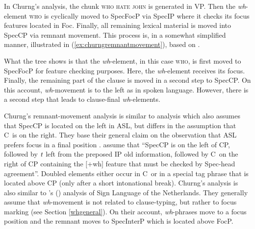 \noindent In Churng's analysis, the chunk \textsc{who hate john} is generated in VP. Then the \textit{wh}-element \textsc{who} is cyclically moved to SpecFocP via SpecIP where it checks its focus features located in Foc\textdegree . Finally, all remaining lexical material is moved into SpecCP via remnant movement. This process is, in a somewhat simplified manner, illustrated in (\ref{ex:churngremnantmovement}), based on \citet[38]{churng2009syntax}.

\begin{exe}
\ex\label{ex:churngremnantmovement} 
\begin{adjustbox}{width=\linewidth}
\end{adjustbox}
\end{exe}

\noindent What the tree shows is that the \textit{wh}-element, in this case \textsc{who}, is first moved to SpecFocP for feature checking purposes. Here, the \textit{wh}-element receives its focus. Finally, the remaining part of the clause is moved in a second step to SpecCP. On this account, \textit{wh}-movement is to the left as in spoken language. However, there is a second step that leads to clause-final \textit{wh}-elements. 

Churng's remnant-movement analysis is similar to \citet{sarac2007cross} analysis which also assumes that SpecCP is located on the left in ASL, but differs in the assumption that C\textdegree\ is on the right. They base their general claim on the observation that ASL prefers focus in a final position \citep{wilbur1996evidence, wilbur1997prosodic, wilbur1998body}. \citet[212]{sarac2007cross} assume that ``SpecCP is on the left of CP, followed by $\textrm{\textit{t}}$ left from the preposed IP old information, followed by C\textdegree\ on the right of CP containing the $[+$wh$]$ feature that must be checked by Spec-head agreement''. Doubled elements either occur in C\textdegree\ or in a special tag phrase that is located above CP (only after a short intonational break). Churng's analysis is also similar to \citeauthor{aboh2010sa}'s (\citeyear{aboh2010sa}) analysis of Sign Language of the Netherlands. They generally assume that \textit{wh}-movement is not related to clause-typing, but rather to focus marking (see Section \ref{whgeneral}). On their account, \textit{wh}-phrases move to a focus position and the remnant moves to SpecInterP which is located above FocP. 

